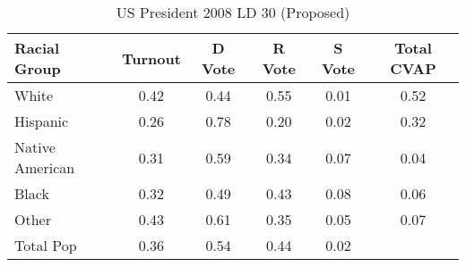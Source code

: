 \begin{table}[htb]
\begin{center}
\caption{US President 2008 LD 30 (Proposed)}
\label{pres08_cvap_ld_30}
\begin{tabular}{lccccc}
  \hline
Racial Group & Turnout & D Vote & R Vote & S Vote & Total CVAP \\ 
  \hline
White & 0.42 & 0.44 & 0.55 & 0.01 & 0.52 \\ 
  Hispanic & 0.26 & 0.78 & 0.20 & 0.02 & 0.32 \\ 
  Native American & 0.31 & 0.59 & 0.34 & 0.07 & 0.04 \\ 
  Black & 0.32 & 0.49 & 0.43 & 0.08 & 0.06 \\ 
  Other & 0.43 & 0.61 & 0.35 & 0.05 & 0.07 \\ 
  Total Pop & 0.36 & 0.54 & 0.44 & 0.02 &  \\ 
   \hline
\end{tabular}
\end{center}
\end{table}
